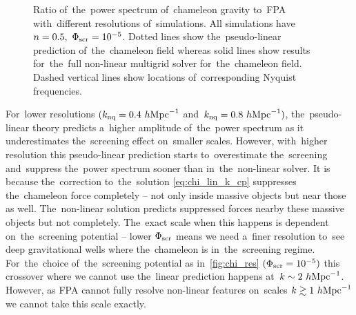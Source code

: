 \begin{figure}[bt]
	\centering
	  \begin{subfigure}{0.85\textwidth}
	  \end{subfigure}
	  \begin{subfigure}{0.85\textwidth}
	  \end{subfigure}
	\caption{Ratio of~the~power spectrum of~chameleon gravity to~FPA with~different resolutions of~simulations. All simulations have $n=0.5,\ \Phi_{\text{\scriptsize scr}}=10^{-5}$. Dotted lines show the~pseudo-linear prediction of~the~chameleon field whereas solid lines show results for~the~full non-linear multigrid solver for~the~chameleon field. Dashed vertical lines show locations of~corresponding Nyquist frequencies.}
	\label{fig:chi_res}
\end{figure}
For~lower resolutions $(k_{\rm nq} = 0.4~h\text{Mpc}^{-1}$ and~$k_{\rm nq} = 0.8~h\text{Mpc}^{-1})$, the~pseudo-linear theory predicts a~higher amplitude of~the~power spectrum as it underestimates the~screening effect on~smaller scales. However, with~higher resolution this pseudo-linear prediction starts to~overestimate the~screening and~suppress the~power spectrum sooner than in~the~non-linear solver. It is because the~correction to~the~solution \eqref{eq:chi_lin_k_cp} suppresses the~chameleon force completely -- not only inside massive objects but near those as well. The~non-linear solution predicts suppressed forces nearby these massive objects but not completely. The~exact scale when this happens is dependent on~the~screening potential -- lower $\Phi_{\text{\scriptsize scr}}$ means we need a~finer resolution to~see deep gravitational wells where the~chameleon is in~the~screening regime. For~the~choice of~the~screening potential as in~\autoref{fig:chi_res} $(\Phi_{\text{\scriptsize scr}}=10^{-5})$ this crossover where we cannot use the~linear prediction happens at~$k\sim2~h\text{Mpc}^{-1}$. However, as FPA cannot fully resolve non-linear features on~scales $k\gtrsim1~h\text{Mpc}^{-1}$  we cannot take this scale exactly.

